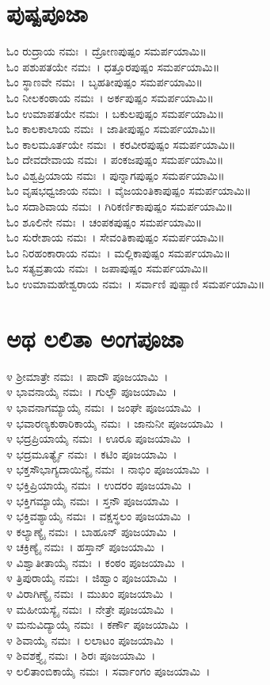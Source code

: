 \section{ಪುಷ್ಪಪೂಜಾ}
ಓಂ ರುದ್ರಾಯ ನಮಃ~। ದ್ರೋಣಪುಷ್ಪಂ ಸಮರ್ಪಯಾಮಿ॥\\
ಓಂ ಪಶುಪತಯೇ ನಮಃ~। ಧತ್ತೂರಪುಷ್ಪಂ ಸಮರ್ಪಯಾಮಿ॥\\
ಓಂ ಸ್ಥಾಣವೇ ನಮಃ~। ಬೃಹತೀಪುಷ್ಪಂ ಸಮರ್ಪಯಾಮಿ॥\\
ಓಂ ನೀಲಕಂಠಾಯ ನಮಃ~। ಅರ್ಕಪುಷ್ಪಂ ಸಮರ್ಪಯಾಮಿ॥\\
ಓಂ ಉಮಾಪತಯೇ ನಮಃ~। ಬಕುಲಪುಷ್ಪಂ ಸಮರ್ಪಯಾಮಿ॥\\
ಓಂ ಕಾಲಕಾಲಾಯ ನಮಃ~। ಜಾತೀಪುಷ್ಪಂ ಸಮರ್ಪಯಾಮಿ॥\\
ಓಂ ಕಾಲಮೂರ್ತಯೇ ನಮಃ~। ಕರವೀರಪುಷ್ಪಂ ಸಮರ್ಪಯಾಮಿ॥\\
ಓಂ ದೇವದೇವಾಯ ನಮಃ~। ಪಂಕಜಪುಷ್ಪಂ ಸಮರ್ಪಯಾಮಿ॥\\
ಓಂ ವಿಶ್ವಪ್ರಿಯಾಯ ನಮಃ~। ಪುನ್ನಾಗಪುಷ್ಪಂ ಸಮರ್ಪಯಾಮಿ॥\\
ಓಂ ವೃಷಭಧ್ವಜಾಯ ನಮಃ~। ವೈಜಯಂತಿಕಾಪುಷ್ಪಂ ಸಮರ್ಪಯಾಮಿ॥\\
ಓಂ ಸದಾಶಿವಾಯ ನಮಃ~। ಗಿರಿಕರ್ಣಿಕಾಪುಷ್ಪಂ ಸಮರ್ಪಯಾಮಿ॥\\
ಓಂ ಶೂಲಿನೇ ನಮಃ~। ಚಂಪಕಪುಷ್ಪಂ ಸಮರ್ಪಯಾಮಿ॥\\
ಓಂ ಸುರೇಶಾಯ ನಮಃ~। ಸೇವಂತಿಕಾಪುಷ್ಪಂ ಸಮರ್ಪಯಾಮಿ॥\\
ಓಂ ನಿರಹಂಕಾರಾಯ ನಮಃ~। ಮಲ್ಲಿಕಾಪುಷ್ಪಂ ಸಮರ್ಪಯಾಮಿ॥\\
ಓಂ ಸತ್ಯವ್ರತಾಯ ನಮಃ~। ಜಪಾಪುಷ್ಪಂ ಸಮರ್ಪಯಾಮಿ॥\\
ಓಂ ಉಮಾಮಹೇಶ್ವರಾಯ ನಮಃ~। ಸರ್ವಾಣಿ ಪುಷ್ಪಾಣಿ ಸಮರ್ಪಯಾಮಿ॥
\section{ಅಥ ಲಲಿತಾ ಅಂಗಪೂಜಾ}
೪ ಶ್ರೀಮಾತ್ರೇ ನಮಃ~। ಪಾದೌ ಪೂಜಯಾಮಿ~।\\
೪ ಭಾವನಾಯೈ ನಮಃ~। ಗುಲ್ಫೌ ಪೂಜಯಾಮಿ~।\\
೪ ಭಾವನಾಗಮ್ಯಾಯೈ ನಮಃ~। ಜಂಘೇ ಪೂಜಯಾಮಿ~।\\
೪ ಭವಾರಣ್ಯಕುಠಾರಿಕಾಯೈ ನಮಃ~। ಜಾನುನೀ ಪೂಜಯಾಮಿ~।\\
೪ ಭದ್ರಪ್ರಿಯಾಯೈ ನಮಃ~। ಊರೂ ಪೂಜಯಾಮಿ~।\\
೪ ಭದ್ರಮೂರ್ತ್ಯೈ ನಮಃ~। ಕಟಿಂ ಪೂಜಯಾಮಿ~।\\
೪ ಭಕ್ತಸೌಭಾಗ್ಯದಾಯಿನ್ಯೈ ನಮಃ~। ನಾಭಿಂ ಪೂಜಯಾಮಿ~।\\
೪ ಭಕ್ತಿಪ್ರಿಯಾಯೈ ನಮಃ~। ಉದರಂ ಪೂಜಯಾಮಿ~।\\
೪ ಭಕ್ತಿಗಮ್ಯಾಯೈ ನಮಃ~। ಸ್ತನೌ ಪೂಜಯಾಮಿ~।\\
೪ ಭಕ್ತಿವಶ್ಯಾಯೈ ನಮಃ~। ವಕ್ಷಸ್ಥಲಂ ಪೂಜಯಾಮಿ~।\\
೪ ಕಲ್ಯಾಣ್ಯೈ ನಮಃ~। ಬಾಹೂನ್ ಪೂಜಯಾಮಿ~।\\
೪ ಚಕ್ರಿಣ್ಯೈ ನಮಃ~। ಹಸ್ತಾನ್ ಪೂಜಯಾಮಿ~।\\
೪ ವಿಶ್ವಾತೀತಾಯೈ ನಮಃ~। ಕಂಠಂ ಪೂಜಯಾಮಿ~।\\
೪ ತ್ರಿಪುರಾಯೈ ನಮಃ~। ಜಿಹ್ವಾಂ ಪೂಜಯಾಮಿ~।\\
೪ ವಿರಾಗಿಣ್ಯೈ ನಮಃ~। ಮುಖಂ ಪೂಜಯಾಮಿ~।\\
೪ ಮಹೀಯಸ್ಯೈ ನಮಃ~। ನೇತ್ರೇ ಪೂಜಯಾಮಿ~।\\
೪ ಮನುವಿದ್ಯಾಯೈ ನಮಃ~। ಕರ್ಣೌ ಪೂಜಯಾಮಿ~।\\
೪ ಶಿವಾಯೈ ನಮಃ~। ಲಲಾಟಂ ಪೂಜಯಾಮಿ~।\\
೪ ಶಿವಶಕ್ತ್ಯೈ ನಮಃ~। ಶಿರಃ ಪೂಜಯಾಮಿ~।\\
೪ ಲಲಿತಾಂಬಿಕಾಯೈ ನಮಃ~। ಸರ್ವಾಂಗಂ ಪೂಜಯಾಮಿ~।

